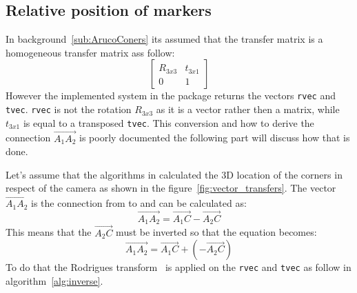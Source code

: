 

\subsection{Relative position of \aruco markers}%
\label{sub:implement:relative}
In background~\ref{sub:ArucoConers} its assumed that the transfer matrix is a homogeneous transfer matrix ass follow:
\[
\begin{bmatrix}
    R_{3x3} & t_{3x1}\\
    0 & 1
\end{bmatrix}
\]
However the implemented system in the \aruco{} package returns the vectors \verb|rvec| and \verb|tvec|.
\verb|rvec| is not the rotation $R_{3x3}$ as it is a vector rather then a matrix, while $t_{3x1}$ is equal to a transposed \verb|tvec|.
This conversion and how to derive the connection $\vec{A_1A_2}$ is poorly documented the following part will discuss how that is done.
\par
Let's assume that the algorithms in \aruco calculated the 3D location of the corners in respect of the camera as shown in the  figure~\ref{fig:vector_transfers}.
The vector $\vec{A_1A_2}$ is the connection from  to  and can be calculated as:
\[
\vec{A_1A_2} = \vec{A_1C} - \vec{A_2C}
\]
This means that the $\vec{A_2C}$ must be inverted so that the equation becomes:
\[
\vec{A_1A_2} = \vec{A_1C} + (-\vec{A_2C})
\]
To do that the Rodrigues transform~\cite{rodriguez1840lois} is applied on the \verb|rvec| and \verb|tvec| as follow in algorithm~\ref{alg:inverse}.

